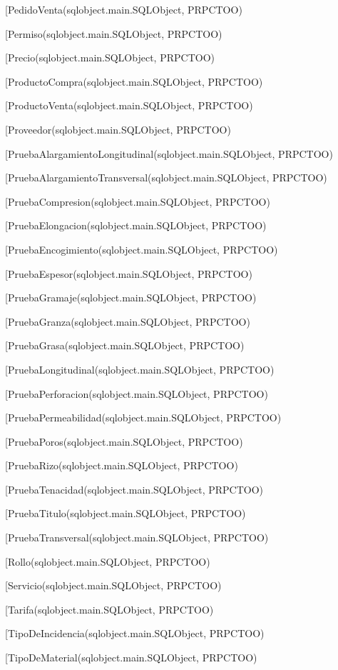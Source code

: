 \begin{description}
\begin{description}
\item[PedidoVenta(sqlobject.main.SQLObject, PRPCTOO)
\item[Permiso(sqlobject.main.SQLObject, PRPCTOO)
\item[Precio(sqlobject.main.SQLObject, PRPCTOO)
\item[ProductoCompra(sqlobject.main.SQLObject, PRPCTOO)
\item[ProductoVenta(sqlobject.main.SQLObject, PRPCTOO)
\item[Proveedor(sqlobject.main.SQLObject, PRPCTOO)
\item[PruebaAlargamientoLongitudinal(sqlobject.main.SQLObject, PRPCTOO)
\item[PruebaAlargamientoTransversal(sqlobject.main.SQLObject, PRPCTOO)
\item[PruebaCompresion(sqlobject.main.SQLObject, PRPCTOO)
\item[PruebaElongacion(sqlobject.main.SQLObject, PRPCTOO)
\item[PruebaEncogimiento(sqlobject.main.SQLObject, PRPCTOO)
\item[PruebaEspesor(sqlobject.main.SQLObject, PRPCTOO)
\item[PruebaGramaje(sqlobject.main.SQLObject, PRPCTOO)
\item[PruebaGranza(sqlobject.main.SQLObject, PRPCTOO)
\item[PruebaGrasa(sqlobject.main.SQLObject, PRPCTOO)
\item[PruebaLongitudinal(sqlobject.main.SQLObject, PRPCTOO)
\item[PruebaPerforacion(sqlobject.main.SQLObject, PRPCTOO)
\item[PruebaPermeabilidad(sqlobject.main.SQLObject, PRPCTOO)
\item[PruebaPoros(sqlobject.main.SQLObject, PRPCTOO)
\item[PruebaRizo(sqlobject.main.SQLObject, PRPCTOO)
\item[PruebaTenacidad(sqlobject.main.SQLObject, PRPCTOO)
\item[PruebaTitulo(sqlobject.main.SQLObject, PRPCTOO)
\item[PruebaTransversal(sqlobject.main.SQLObject, PRPCTOO)
\item[Rollo(sqlobject.main.SQLObject, PRPCTOO)
\item[Servicio(sqlobject.main.SQLObject, PRPCTOO)
\item[Tarifa(sqlobject.main.SQLObject, PRPCTOO)
\item[TipoDeIncidencia(sqlobject.main.SQLObject, PRPCTOO)
\item[TipoDeMaterial(sqlobject.main.SQLObject, PRPCTOO)

\end{description}
\end{description}
